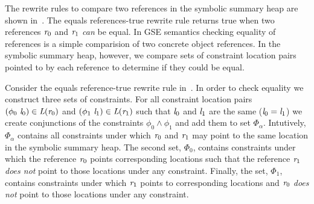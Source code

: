 \newsavebox{\boxPEX}


The rewrite rules to compare two references in the symbolic summary
heap are shown in~. The equals references-true rewrite
rule returns true when two references $\emph{r}_0$ and $\emph{r}_1$ \emph{can} be
equal. In GSE semantics checking equality of references is a simple
comparision of two concrete object references. In the symbolic summary
heap, however, we compare sets of constraint location pairs pointed to
by each reference to determine if they could be equal. 

Consider the equals reference-true rewrite rule
in~. In order to check equality we construct three
sets of constraints. For all constraint location pairs $(\phi_0\ \cfgnt{l}_0)
\in \cfgnt{L}(\cfgnt{r}_0)$ and $(\phi_1\ \emph{l}_1) \in \emph{L}(\emph{r}_1)$ such that $\emph{l}_0$ and $\emph{l}_1$
are the same ($\emph{l}_0 = \emph{l}_1$) we create conjunctions of the constraints
$\phi_0 \wedge \phi_1$ and add them to set $\Phi_\alpha$. Intutively,
$\Phi_\alpha$ contains all constraints under which $\emph{r}_0$ and $\emph{r}_1$ may
point to the same location in the symbolic summary heap. The second
set, $\Phi_0$, contains constraints under which the reference $\emph{r}_0$
points corresponding locations such that the reference $\emph{r}_1$
\emph{does not} point to those locations under any
constraint. Finally, the set, $\Phi_1$, contains constraints under
which $\emph{r}_1$ points to corresponding locations and $\emph{r}_0$ \emph{does
  not} point to those locations under any constraint.

